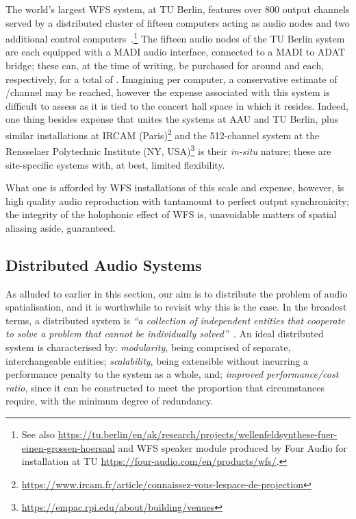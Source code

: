 \documentclass[utf8]{FrontiersinHarvard}
\begin{document}
    The world's largest WFS system, at TU Berlin, features over 800 output channels
    served by a distributed cluster of fifteen computers acting as audio nodes and
    two additional control computers~\citep{baalman_renewed_2007}.\footnote{
        See also
        \url{https://tu.berlin/en/ak/research/projects/wellenfeldsynthese-fuer-einen-grossen-hoersaal}
        and WFS speaker module produced by Four Audio for installation at TU
        \url{https://four-audio.com/en/products/wfs/}.
    }
    The fifteen audio nodes of the TU Berlin system are each equipped with a MADI
    audio interface, connected to a MADI to ADAT bridge;
    these can, at the time of writing, be purchased for around 
    and  each, respectively, for a total of
    .
    Imagining  per computer, a conservative estimate of
    /channel may be reached, however the expense associated with this
    system is difficult to assess as it is tied to the concert hall space in which
    it resides.
    Indeed, one thing besides expense that unites the systems at AAU and TU Berlin,
    plus similar installations at IRCAM (Paris)\footnote{
        \url{https://www.ircam.fr/article/connaissez-vous-lespace-de-projection}
    } and the 512-channel system at the Rensselaer Polytechnic Institute
    (NY, USA)\footnote{
        \url{https://empac.rpi.edu/about/building/venues}
    } is their \textit{in-situ} nature;
    these are site-specific systems with, at best, limited flexibility.

    What one is afforded by WFS installations of this scale and expense, however, is
    high quality audio reproduction with tantamount to perfect output synchronicity;
    the integrity of the holophonic effect of WFS is, unavoidable matters of spatial
    aliasing aside, guaranteed.

    \subsection{Distributed Audio Systems}\label{subsec:distributed-audio-systems}

    As alluded to earlier in this section, our aim is to distribute the problem of
    audio spatialisation, and it is worthwhile to revisit why this is the case.
    In the broadest terms, a distributed system is \textit{``a collection of
    independent entities that cooperate to solve a problem that cannot be
    individually solved''}~\citep{kshemkalyani_distributed_2011}.
    An ideal distributed system is characterised by: \textit{modularity}, being
    comprised of separate, interchangeable entities; \textit{scalability}, being
    extensible without incurring a performance penalty to the system as a whole,
    and; \textit{improved performance/cost ratio}, since it can be constructed to
    meet the proportion that circumstances require, with the minimum degree of
    redundancy.
\end{document}
